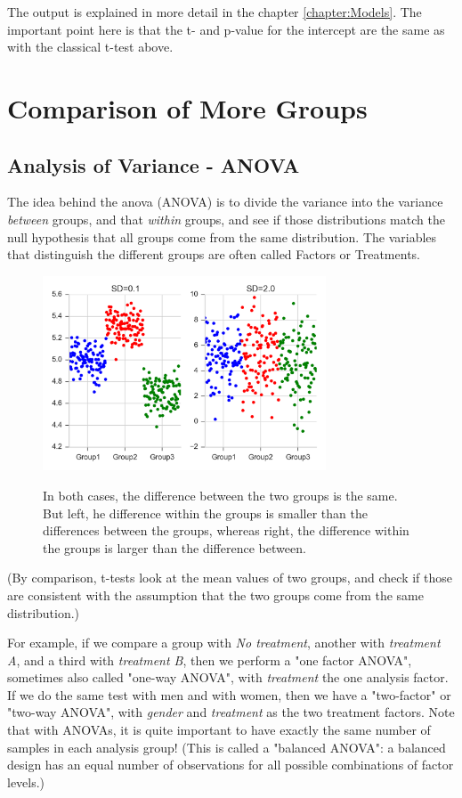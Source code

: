 The output is explained in more detail in the chapter \ref{chapter:Models}. The important point here is that the t- and p-value for the intercept are the same as with the classical t-test above.

\section{Comparison of More Groups}

\subsection{Analysis of Variance - ANOVA} \label{sec:anova}  

The idea behind the \acrfull{anova} (ANOVA) is to divide the variance into the variance \emph{between} groups, and that \emph{within} groups, and see if those distributions match the null hypothesis that all groups come from the same distribution. The variables that distinguish the different groups are often called Factors or Treatments.

\begin{figure}
  \centering
  \includegraphics[width=0.75\textwidth]{../Images/ANOVA_oneway.png}\\
  \caption{In both cases, the difference between the two groups is the same. But left, he difference within the groups is smaller than the differences between the groups, whereas right, the difference within the groups is larger than the difference between.}\label{fig:ANOVA_oneway}
\end{figure}

(By comparison, t-tests look at the mean values of two groups, and check if those are consistent with the assumption that the two groups come from the same distribution.)

For example, if we compare a group with \emph{No treatment}, another with \emph{treatment A}, and a third with \emph{treatment B}, then we perform a "one factor ANOVA", sometimes also called "one-way ANOVA", with \emph{treatment} the one analysis factor. If we do the same test with men and with women, then we have a "two-factor" or "two-way ANOVA", with \emph{gender} and \emph{treatment} as the two treatment factors. Note that with ANOVAs, it is quite important to have exactly the same number of samples in each analysis group! (This is called a "balanced ANOVA": a balanced design has an equal number of observations for all possible combinations of factor levels.)

